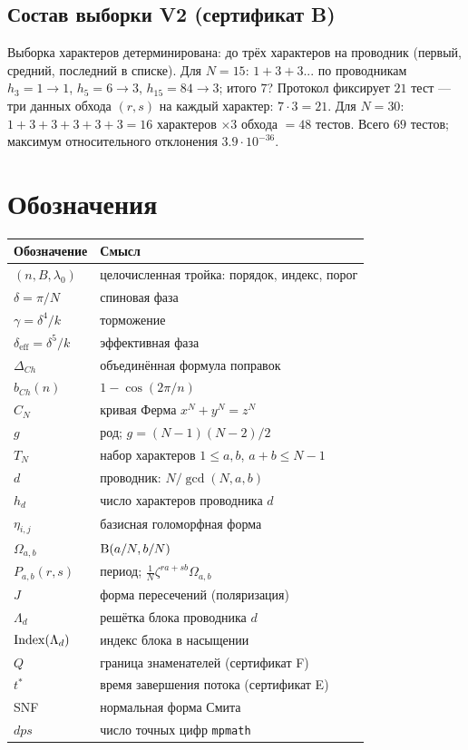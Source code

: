 \subsection{Состав выборки V2 (сертификат B)}

Выборка характеров детерминирована: до трёх характеров на проводник
(первый, средний, последний в списке). Для $N=15$: $1+3+3$... по
проводникам $h_3=1\to1$, $h_5=6\to3$, $h_{15}=84\to3$; итого
$7$? Протокол фиксирует $21$ тест --- три данных обхода $(r,s)$
на каждый характер: $7\cdot3=21$. Для $N=30$: $1+3+3+3+3+3=16$
характеров $\times3$ обхода $=48$ тестов. Всего $69$ тестов;
максимум относительного отклонения $3.9\cdot10^{-36}$.

\section{Обозначения}\label{app:notation}

\begin{center}
\small
\begin{tabular}{@{}l l@{}}
\toprule
Обозначение & Смысл \\
\midrule
$(n,B,\lambda_0)$ & целочисленная тройка: порядок, индекс, порог \\
$\delta=\pi/N$ & спиновая фаза \\
$\gamma=\delta^4/k$ & торможение \\
$\delta_{\mathrm{eff}}=\delta^5/k$ & эффективная фаза \\
$\Delta_{Ch}$ & объединённая формула поправок \\
$b_{Ch}(n)$ & $1-\cos(2\pi/n)$ \\
$C_N$ & кривая Ферма $x^N+y^N=z^N$ \\
$g$ & род; $g=(N-1)(N-2)/2$ \\
$T_N$ & набор характеров $1\le a,b$, $a+b\le N-1$ \\
$d$ & проводник: $N/\gcd(N,a,b)$ \\
$h_d$ & число характеров проводника $d$ \\
$\eta_{i,j}$ & базисная голоморфная форма \\
$\Omega_{a,b}$ & $\mathrm{B}(a/N,b/N)$ \\
$P_{a,b}(r,s)$ & период; $\tfrac1N\zeta^{ra+sb}\Omega_{a,b}$ \\
$J$ & форма пересечений (поляризация) \\
$\Lambda_d$ & решётка блока проводника $d$ \\
$\operatorname{Index}(\Lambda_d)$ & индекс блока в насыщении \\
$Q$ & граница знаменателей (сертификат F) \\
$t^*$ & время завершения потока (сертификат E) \\
SNF & нормальная форма Смита \\
$dps$ & число точных цифр \texttt{mpmath} \\
\bottomrule
\end{tabular}
\end{center}

